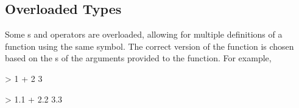 \subsection{Overloaded Types}\label{subsec:Overloaded_Types}
Some s and operators are overloaded, allowing for multiple definitions of a function using the same symbol.
The correct version of the function is chosen based on the s of the arguments provided to the function.
For example,
\begin{haskellsource}
> 1 + 2
3

> 1.1 + 2.2
3.3
\end{haskellsource}


